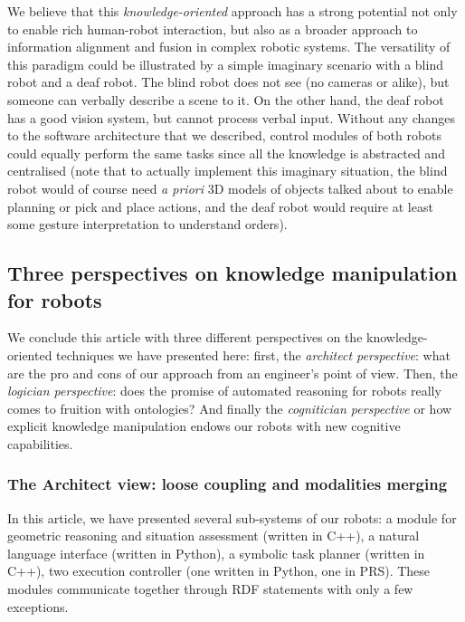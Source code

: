 \documentclass[letterpaper, 10 pt, conference]{ieeeconf}  %
\begin{document}
We believe that this \emph{knowledge-oriented} approach has a strong potential
not only to enable rich human-robot interaction, but also as a broader approach
to information alignment and fusion in complex robotic systems.  The
versatility of this paradigm could be illustrated by a simple imaginary
scenario with a blind robot and a deaf robot. The blind robot does not see (no
cameras or alike), but someone can verbally describe a scene to it. On the
other hand, the deaf robot has a good vision system, but cannot process verbal
input.  Without any changes to the software architecture that we described,
control modules of both robots could equally perform the same tasks since all
the knowledge is abstracted and centralised (note that to actually implement
this imaginary situation, the blind robot would of course need \textit{a
priori} 3D models of objects talked about to enable planning or pick and place
actions, and the deaf robot would require at least some gesture interpretation
to understand orders).


\subsection{Three perspectives on knowledge manipulation for robots}

We conclude this article with three different perspectives on the knowledge-oriented
techniques we have presented here: first, the \emph{architect perspective}:
what are the pro and cons of our approach from an engineer's point of view. Then,
the \emph{logician perspective}: does the promise of automated reasoning for
robots really comes to fruition with ontologies? And finally the
\emph{cognitician perspective} or how explicit knowledge manipulation endows
our robots with new cognitive capabilities.

\subsubsection{The Architect view: loose coupling and modalities merging}

In this article, we have presented several sub-systems of our robots: a module for geometric
reasoning and situation assessment (written in C++), a natural
language interface (written in Python), a symbolic task planner (written in
C++), two execution controller (one written in Python, one in PRS). These
modules communicate together through RDF statements with only a few exceptions.
\end{document}
